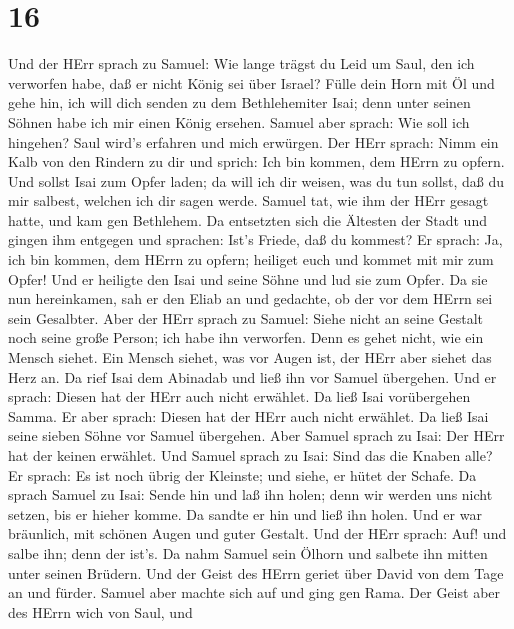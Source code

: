 \hypertarget{section-15}{%
\section{16}\label{section-15}}

 Und der HErr sprach zu Samuel: Wie lange trägst du Leid um
Saul, den ich verworfen habe, daß er nicht König sei über Israel? Fülle
dein Horn mit Öl und gehe hin, ich will dich senden zu dem Bethlehemiter
Isai; denn unter seinen Söhnen habe ich mir einen König ersehen.
 Samuel aber sprach: Wie soll ich hingehen? Saul wird's
erfahren und mich erwürgen. Der HErr sprach: Nimm ein Kalb von den
Rindern zu dir und sprich: Ich bin kommen, dem HErrn zu opfern.
 Und sollst Isai zum Opfer laden; da will ich dir weisen,
was du tun sollst, daß du mir salbest, welchen ich dir sagen werde.
 Samuel tat, wie ihm der HErr gesagt hatte, und kam gen
Bethlehem. Da entsetzten sich die Ältesten der Stadt und gingen ihm
entgegen und sprachen: Ist's Friede, daß du kommest?  Er
sprach: Ja, ich bin kommen, dem HErrn zu opfern; heiliget euch und
kommet mit mir zum Opfer! Und er heiligte den Isai und seine Söhne und
lud sie zum Opfer.  Da sie nun hereinkamen, sah er den Eliab
an und gedachte, ob der vor dem HErrn sei sein Gesalbter. 
Aber der HErr sprach zu Samuel: Siehe nicht an seine Gestalt noch seine
große Person; ich habe ihn verworfen. Denn es gehet nicht, wie ein
Mensch siehet. Ein Mensch siehet, was vor Augen ist, der HErr aber
siehet das Herz an.  Da rief Isai dem Abinadab und ließ ihn
vor Samuel übergehen. Und er sprach: Diesen hat der HErr auch nicht
erwählet.  Da ließ Isai vorübergehen Samma. Er aber sprach:
Diesen hat der HErr auch nicht erwählet.  Da ließ Isai
seine sieben Söhne vor Samuel übergehen. Aber Samuel sprach zu Isai: Der
HErr hat der keinen erwählet.  Und Samuel sprach zu Isai:
Sind das die Knaben alle? Er sprach: Es ist noch übrig der Kleinste; und
siehe, er hütet der Schafe. Da sprach Samuel zu Isai: Sende hin und laß
ihn holen; denn wir werden uns nicht setzen, bis er hieher komme.
 Da sandte er hin und ließ ihn holen. Und er war bräunlich,
mit schönen Augen und guter Gestalt. Und der HErr sprach: Auf! und salbe
ihn; denn der ist's.  Da nahm Samuel sein Ölhorn und
salbete ihn mitten unter seinen Brüdern. Und der Geist des HErrn geriet
über David von dem Tage an und fürder. Samuel aber machte sich auf und
ging gen Rama.  Der Geist aber des HErrn wich von Saul, und
